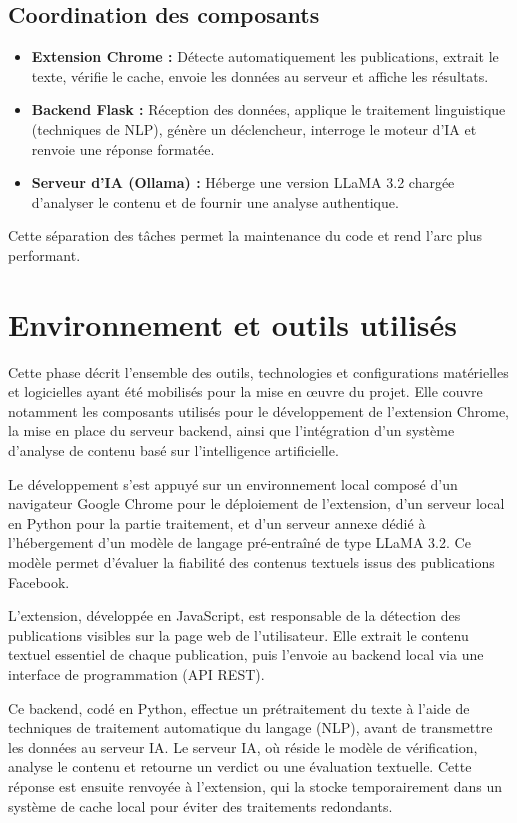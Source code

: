 \subsection*{Coordination des composants}
\begin{itemize}
    \item \textbf{Extension Chrome :} Détecte automatiquement les publications, extrait le texte, vérifie le cache, envoie les données au serveur et affiche les résultats.
    \item \textbf{Backend Flask :} Réception des données, applique le traitement linguistique (techniques de NLP), génère un déclencheur, interroge le moteur d'IA et renvoie une réponse formatée.
    \item \textbf{Serveur d'IA (Ollama) :} Héberge une version LLaMA 3.2 chargée d'analyser le contenu et de fournir une analyse authentique.
\end{itemize}
Cette séparation des tâches permet la maintenance du code et rend l'arc plus performant.
\section{Environnement et outils utilisés}
Cette phase décrit l'ensemble des outils, technologies et configurations matérielles et logicielles ayant été mobilisés pour la mise en œuvre du projet. Elle couvre notamment les composants utilisés pour le développement de l'extension Chrome, la mise en place du serveur backend, ainsi que l'intégration d'un système d'analyse de contenu basé sur l'intelligence artificielle.

Le développement s'est appuyé sur un environnement local composé d'un navigateur Google Chrome pour le déploiement de l'extension, d'un serveur local en Python pour la partie traitement, et d'un serveur annexe dédié à l'hébergement d'un modèle de langage pré-entraîné de type LLaMA 3.2. Ce modèle permet d'évaluer la fiabilité des contenus textuels issus des publications Facebook.

L'extension, développée en JavaScript, est responsable de la détection des publications visibles sur la page web de l'utilisateur. Elle extrait le contenu textuel essentiel de chaque publication, puis l'envoie au backend local via une interface de programmation (API REST).

Ce backend, codé en Python, effectue un prétraitement du texte à l'aide de techniques de traitement automatique du langage (NLP), avant de transmettre les données au serveur IA. Le serveur IA, où réside le modèle de vérification, analyse le contenu et retourne un verdict ou une évaluation textuelle. Cette réponse est ensuite renvoyée à l'extension, qui la stocke temporairement dans un système de cache local pour éviter des traitements redondants.

